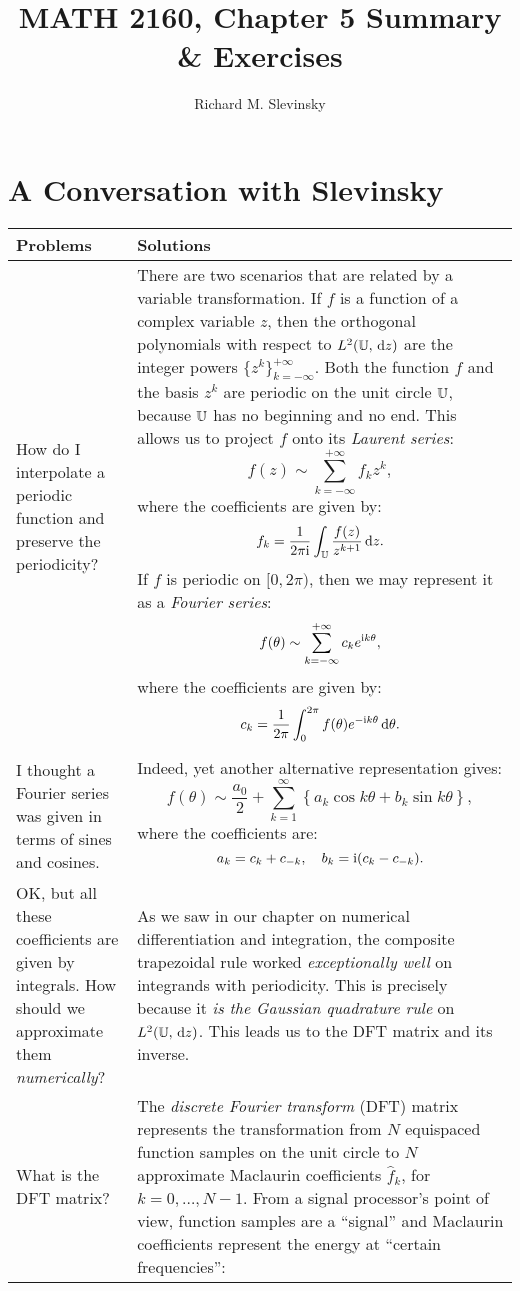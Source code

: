 \documentclass[11pt,letterpaper]{article}
\begin{document}
\title{MATH 2160, Chapter 5 Summary \& Exercises}
\author{Richard M. Slevinsky}
\date{}
\maketitle

\section*{A Conversation with Slevinsky}

\begin{longtable}{p{}|p{}}
\hline
Problems & Solutions\\
\hline
How do I interpolate a periodic function and preserve the periodicity? & There are two scenarios that are related by a variable transformation. If $f$ is a function of a complex variable $z$, then the orthogonal polynomials with respect to $L^2(\mathbb{U},{\rm\,d} z)$ are the integer powers $\{z^k\}_{k=-\infty}^{+\infty}$. Both the function $f$ and the basis $z^k$ are periodic on the unit circle $\mathbb{U}$, because $\mathbb{U}$ has no beginning and no end. This allows us to project $f$ onto its {\em Laurent series}:
\[
f(z) \sim \sum_{k=-\infty}^{+\infty} f_k z^k,
\]
where the coefficients are given by:
\[
f_k = \dfrac{1}{2\pi{\rm i}}\int_{\mathbb{U}} \dfrac{f(z)}{z^{k+1}}{\rm\,d} z.
\]
If $f$ is periodic on $[0,2\pi)$, then we may represent it as a {\em Fourier series}:
\[
f(\theta) \sim \sum_{k=-\infty}^{+\infty} c_k e^{{\rm i} k\theta},
\]
where the coefficients are given by:
\[
c_k = \dfrac{1}{2\pi}\int_0^{2\pi} f(\theta) e^{-{\rm i} k\theta}{\rm\,d}\theta.
\]\\
I thought a Fourier series was given in terms of sines and cosines. & Indeed, yet another alternative representation gives:
\[
f(\theta) \sim \dfrac{a_0}{2} + \sum_{k=1}^\infty \left\{ a_k\cos k\theta + b_k\sin k\theta\right\},
\]
where the coefficients are:
\[
a_k = c_k+c_{-k},\quad b_k = {\rm i}(c_k-c_{-k}).
\]
\\
\hline
OK, but all these coefficients are given by integrals. How should we approximate them {\em numerically}? & As we saw in our chapter on numerical differentiation and integration, the composite trapezoidal rule worked {\em exceptionally well} on integrands with periodicity. This is precisely because it {\em is the Gaussian quadrature rule} on $L^2(\mathbb{U},{\rm\,d} z)$. This leads us to the DFT matrix and its inverse.\\
\hline
What is the DFT matrix? & The {\em discrete Fourier transform} (DFT) matrix represents the transformation from $N$ equispaced function samples on the unit circle to $N$ approximate Maclaurin coefficients $\hat{f}_k$, for $k=0,\ldots,N-1$. From a signal processor's point of view, function samples are a ``signal'' and Maclaurin coefficients represent the energy at ``certain frequencies'':

\end{longtable}
\end{document}
